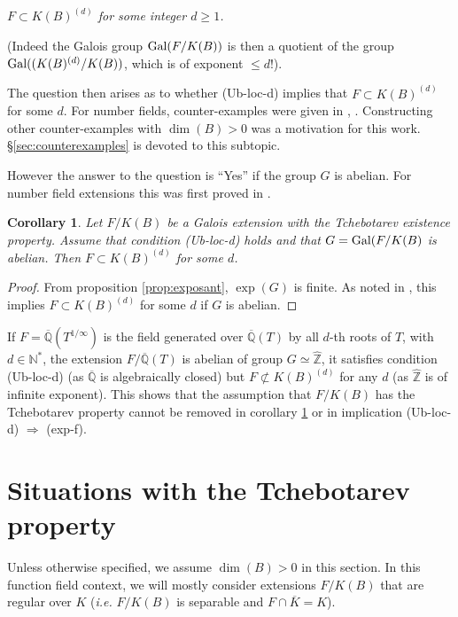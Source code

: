 \documentclass[12pt,english]{amsart}
\newtheorem{twisting lemma}[theorem]{Twisting lemma}
\newtheorem{corollary}[theorem]{Corollary}
\begin{document}
\noindent
\hskip 2mm {\it $F\subset K(B)^{(d)}$ for some integer $d\geq 1$.}
\vskip 2mm

\noindent
(Indeed the Galois group ${\hbox{\rm Gal}}(F/K(B))$ is then a quotient of the group
 ${\hbox{\rm Gal}}((K(B)^{(d)}/K(B))$,  which is of exponent $\leq d!$).
 \vskip 2mm

The question then arises as to whether {\rm (Ub-loc-d)} 
implies that
$F\subset K(B)^{(d)}$ for some $d$. 
For number fields, counter-examples were given in \cite{ChZa}, \cite{Ch}. Constructing other counter-examples with $\dim(B)>0$ was a motivation for this work.  
\S \ref{sec:counterexamples} is devoted to this subtopic.

\vskip 1mm

However the answer to the question is ``Yes'' if  the group $G$ 
is  abelian. For number field extensions this was first proved in \cite{ChZa}.

\begin{corollary}\label{cor:abelian} Let $F/K(B)$ be a Galois extension with the Tchebotarev existence property. Assume that condition {\rm (Ub-loc-d)} holds and that $G={\hbox{\rm Gal}}(F/K(B)$ is abelian. 
Then $F\subset K(B)^{(d)}$ for some $d$. 
\end{corollary}

\begin{proof}
From proposition \ref{prop:exposant},  $\exp(G)$ is finite. As noted 
in \cite[prop. 2.1]{ChZa}, this implies $F\subset K(B)^{(d)}$ for some $d$ if $G$ is abelian.
\end{proof}

If $F=\overline {\mathbb{Q}}(T^{1/\infty})$ is the field generated over $\overline {\mathbb{Q}}(T)$ by all $d$-th roots of $T$, with $d\in {\mathbb{N}}^\ast$, the extension $F/\overline{\mathbb{Q}}(T)$ is abelian of group $G\simeq \widehat {\mathbb{Z}}$, it satisfies condition (Ub-loc-d) (as $\overline {\mathbb{Q}}$ is algebraically closed)  but $F\not\subset K(B)^{(d)}$ for any $d$ (as $\widehat {\mathbb{Z}}$ is of infinite exponent). This shows that the assumption that $F/K(B)$ has the Tchebotarev property cannot be removed in corollary \ref{cor:abelian} or in implication (Ub-loc-d) $\Rightarrow$ (exp-f).

\section{Situations with the Tchebotarev property} \label{sec:situations}

Unless otherwise specified, we assume $\dim(B)>0$ in this section. In this function field context, we will mostly consider extensions $F/K(B)$ that are regular over $K$ ({\it i.e.} $F/K(B)$ is separable and $F\cap \overline K= K$).
\end{document}
